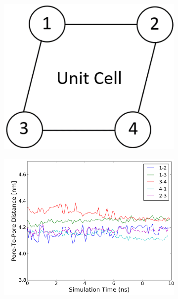 \documentclass{article}
\begin{document}
  \begin{figure}[!ht]
	\centering
	\begin{subfigure}{0.31\textwidth}
		\centering
		\includegraphics[width=\textwidth]{p2p_diagram.PNG}
		\caption{}\label{fig:p2p_diagram}
	\end{subfigure}
		\begin{subfigure}{0.31\textwidth}
		\centering
		\includegraphics[width=\textwidth]{no_xlink_p2p.png}
		\caption{}\label{fig:no_xlink_p2p}
	\end{subfigure}
		\begin{subfigure}{0.31\textwidth}

\end{subfigure}
\end{figure}
\end{document}
